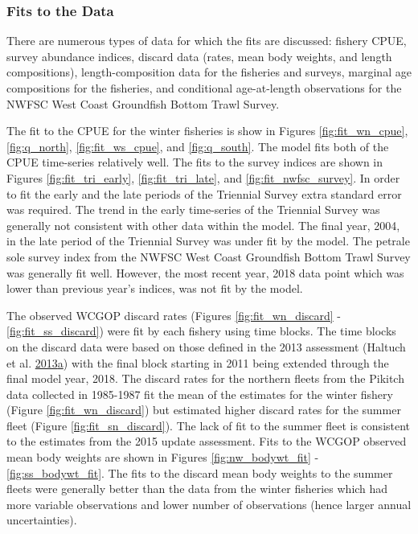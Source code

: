 \documentclass[12pt,]{article}
\begin{document}
\subsubsection{Fits to the Data}\label{fits-to-the-data}

There are numerous types of data for which the fits are discussed:
fishery CPUE, survey abundance indices, discard data (rates, mean body
weights, and length compositions), length-composition data for the
fisheries and surveys, marginal age compositions for the fisheries, and
conditional age-at-length observations for the NWFSC West Coast
Groundfish Bottom Trawl Survey.

The fit to the CPUE for the winter fisheries is show in Figures
\ref{fig:fit_wn_cpue}, \ref{fig:q_north}, \ref{fig:fit_ws_cpue}, and
\ref{fig:q_south}. The model fits both of the CPUE time-series
relatively well. The fits to the survey indices are shown in Figures
\ref{fig:fit_tri_early}, \ref{fig:fit_tri_late}, and
\ref{fig:fit_nwfsc_survey}. In order to fit the early and the late
periods of the Triennial Survey extra standard error was required. The
trend in the early time-series of the Triennial Survey was generally not
consistent with other data within the model. The final year, 2004, in
the late period of the Triennial Survey was under fit by the model. The
petrale sole survey index from the NWFSC West Coast Groundfish Bottom
Trawl Survey was generally fit well. However, the most recent year, 2018
data point which was lower than previous year's indices, was not fit by
the model.

The observed WCGOP discard rates (Figures \ref{fig:fit_wn_discard} -
\ref{fig:fit_ss_discard}) were fit by each fishery using time blocks.
The time blocks on the discard data were based on those defined in the
2013 assessment (Haltuch et al.
\protect\hyperlink{ref-haltuch_california_2013}{2013}\protect\hyperlink{ref-haltuch_california_2013}{a})
with the final block starting in 2011 being extended through the final
model year, 2018. The discard rates for the northern fleets from the
Pikitch data collected in 1985-1987 fit the mean of the estimates for
the winter fishery (Figure \ref{fig:fit_wn_discard}) but estimated
higher discard rates for the summer fleet (Figure
\ref{fig:fit_sn_discard}). The lack of fit to the summer fleet is
consistent to the estimates from the 2015 update assessment. Fits to the
WCGOP observed mean body weights are shown in Figures
\ref{fig:nw_bodywt_fit} - \ref{fig:ss_bodywt_fit}. The fits to the
discard mean body weights to the summer fleets were generally better
than the data from the winter fisheries which had more variable
observations and lower number of observations (hence larger annual
uncertainties).
\end{document}
